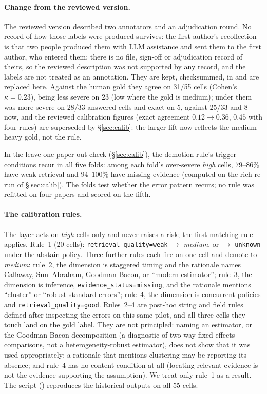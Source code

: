\paragraph{Change from the reviewed version.}
The reviewed version described two annotators and an adjudication round. No
record of how those labels were produced survives: the first author's
recollection is that two people produced them with LLM assistance and sent them
to the first author, who entered them; there is no file, sign-off or
adjudication record of theirs, so the reviewed description was not supported by
any record, and the labels are not treated as an annotation. They are kept,
checksummed, in  and are replaced
here. Against the human gold they agree on 31/55 cells (Cohen's $\kappa=0.23$),
being less severe on 23 (low where the gold is medium); under them \sys{} was
more severe on 28/33 answered cells and exact on 5, against 25/33 and 8 now, and
the reviewed calibration figures (exact agreement $0.12 \to 0.36$, $0.45$ with
four rules) are superseded by \S\ref{sec:calib}: the larger lift now reflects
the medium-heavy gold, not the rule.

In the leave-one-paper-out check (\S\ref{sec:calib}), the demotion rule's
trigger conditions recur in all five folds: among each fold's over-severe
\emph{high} cells, $79$--$86\%$ have weak retrieval and $94$--$100\%$ have
missing evidence (computed on the rich re-run of \S\ref{sec:calib}). The folds test whether the error pattern recurs; no rule was refitted
on four papers and scored on the fifth.

\paragraph{The calibration rules.}
The layer acts on \emph{high} cells only and never raises a risk; the first
matching rule applies. Rule~1 (20 cells): \texttt{retrieval\_quality=weak}
$\to$ \emph{medium}, or $\to$ \texttt{unknown} under the abstain policy. Three
further rules each fire on one cell and demote to \emph{medium}: rule~2, the
dimension is staggered timing and the rationale names Callaway, Sun--Abraham,
Goodman-Bacon, or ``modern estimator''; rule~3, the dimension is inference,
\texttt{evidence\_status=missing}, and the rationale mentions ``cluster'' or
``robust standard errors''; rule~4, the dimension is concurrent policies and
\texttt{retrieval\_quality=good}. Rules~2--4 are post-hoc string and field
rules defined after inspecting the errors on this same pilot, and all three
cells they touch land on the gold label. They are not principled: naming an
estimator, or the Goodman-Bacon decomposition (a diagnostic of two-way
fixed-effects comparisons, not a heterogeneity-robust estimator), does not show
that it was used appropriately; a rationale that mentions clustering may be
reporting its absence; and rule~4 has no content condition at all (locating
relevant evidence is not the evidence supporting the assumption). We treat only
rule~1 as a result. The script
() reproduces the historical outputs on all 55
cells.

